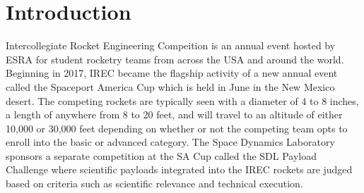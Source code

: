 \documentclass[conference]{IEEEtran} %
\begin{document}
\label{sec:nomenclature}
\newcommand{\nomunit}[1]{%
\renewcommand{\nomentryend}{\hspace*{\fill}#1}}
\renewcommand{\nompreamble}{

  }
\printnomenclature{}



\section{Introduction}
\label{sec:introduction}

 Intercollegiate Rocket Engineering Compeition is an annual event hosted by ESRA for student rocketry teams from across the USA and around the world.
Beginning in 2017, IREC became the flagship activity of a new annual event called the Spaceport America Cup which is held in June in the New Mexico desert.
The competing rockets are typically seen with a diameter of 4 to 8 inches, a length of anywhere from 8 to 20 feet, and will travel to an altitude of either 10,000 or 30,000
feet depending on whether or not the competing team opts to enroll into the basic or advanced category. The Space Dynamics Laboratory sponsors a separate competition at the SA Cup
called the SDL Payload Challenge where scientific payloads integrated into the IREC rockets are judged based on criteria such as scientific relevance and technical execution.
\end{document}
